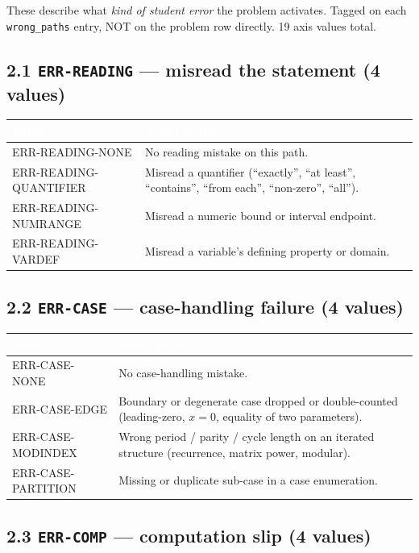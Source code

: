 \documentclass[11pt,letterpaper]{article}
\newcommand{\cd}[1]{\texttt{\small #1}}
\begin{document}
These describe what \emph{kind of student error} the problem activates. Tagged on each \cd{wrong\_paths} entry, NOT on the problem row directly. 19 axis values total.

\subsection*{2.1 \cd{ERR-READING} --- misread the statement (4 values)}

\begin{tabular}{|p{3cm}|p{12.5cm}|}
\hline
\rowcolor{headergray}\textcolor{white}{\textbf{Value}} & \textcolor{white}{\textbf{When to tag}} \\
\hline
ERR-READING-NONE & No reading mistake on this path. \\
\rowcolor{altrow}ERR-READING-QUANTIFIER & Misread a quantifier (``exactly'', ``at least'', ``contains'', ``from each'', ``non-zero'', ``all''). \\
ERR-READING-NUMRANGE & Misread a numeric bound or interval endpoint. \\
\rowcolor{altrow}ERR-READING-VARDEF & Misread a variable's defining property or domain. \\
\hline
\end{tabular}

\subsection*{2.2 \cd{ERR-CASE} --- case-handling failure (4 values)}

\begin{tabular}{|p{3cm}|p{12.5cm}|}
\hline
\rowcolor{headergray}\textcolor{white}{\textbf{Value}} & \textcolor{white}{\textbf{When to tag}} \\
\hline
ERR-CASE-NONE & No case-handling mistake. \\
\rowcolor{altrow}ERR-CASE-EDGE & Boundary or degenerate case dropped or double-counted (leading-zero, $x=0$, equality of two parameters). \\
ERR-CASE-MODINDEX & Wrong period / parity / cycle length on an iterated structure (recurrence, matrix power, modular). \\
\rowcolor{altrow}ERR-CASE-PARTITION & Missing or duplicate sub-case in a case enumeration. \\
\hline
\end{tabular}

\subsection*{2.3 \cd{ERR-COMP} --- computation slip (4 values)}
\end{document}
